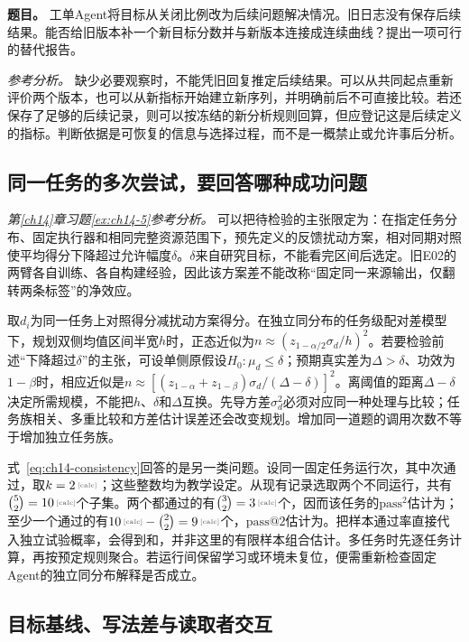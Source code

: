 \textbf{题目。} 工单Agent将目标从关闭比例改为后续问题解决情况。旧日志没有保存后续结果。能否给旧版本补一个新目标分数并与新版本连接成连续曲线？提出一项可行的替代报告。

\emph{参考分析。} 缺少必要观察时，不能凭旧回复推定后续结果。可以从共同起点重新评价两个版本，也可以从新指标开始建立新序列，并明确前后不可直接比较。若还保存了足够的后续记录，则可以按冻结的新分析规则回算，但应登记这是后续定义的指标。判断依据是可恢复的信息与选择过程，而不是一概禁止或允许事后分析。


\subsection{同一任务的多次尝试，要回答哪种成功问题}

\emph{第\ref{ch14}章习题\ref{ex:ch14-5}参考分析。} 可以把待检验的主张限定为：在指定任务分布、固定执行器和相同完整资源范围下，预先定义的反馈扰动方案，相对同期对照使平均得分下降超过允许幅度$\delta$。$\delta$来自研究目标，不能看完区间后选定。旧E02的两臂各自训练、各自构建经验，因此该方案差不能改称“固定同一来源输出，仅翻转两条标签”的净效应。

取$d_i$为同一任务上对照得分减扰动方案得分。在独立同分布的任务级配对差模型下，规划双侧均值区间半宽$h$时，正态近似为$n\approx(z_{1-\alpha/2}\sigma_d/h)^2$。若要检验前述“下降超过$\delta$”的主张，可设单侧原假设$H_0:\mu_d\le\delta$；预期真实差为$\Delta>\delta$、功效为$1-\beta$时，相应近似是$n\approx[(z_{1-\alpha}+z_{1-\beta})\sigma_d/(\Delta-\delta)]^2$。离阈值的距离$\Delta-\delta$决定所需规模，不能把$h$、$\delta$和$\Delta$互换。先导方差$\sigma_d^2$必须对应同一种处理与比较；任务族相关、多重比较和方差估计误差还会改变规划。增加同一道题的调用次数不等于增加独立任务族。

式~\ref{eq:ch14-consistency}回答的是另一类问题。设同一固定任务运行次，其中次通过，取$k=\calcnum{2}$；这些整数均为教学设定。从现有记录选取两个不同运行，共有$\binom52=\calcnum{10}$个子集。两个都通过的有$\binom32=\calcnum{3}$个，因而该任务的$\mathrm{pass}^{2}$估计为；至少一个通过的有$\calcnum{10}-\binom22=\calcnum{9}$个，$\mathrm{pass}@2$估计为。把样本通过率直接代入独立试验概率，会得到和，并非这里的有限样本组合估计。多任务时先逐任务计算，再按预定规则聚合。若运行间保留学习或环境未复位，便需重新检查固定Agent的独立同分布解释是否成立。

\subsection{目标基线、写法差与读取者交互}

